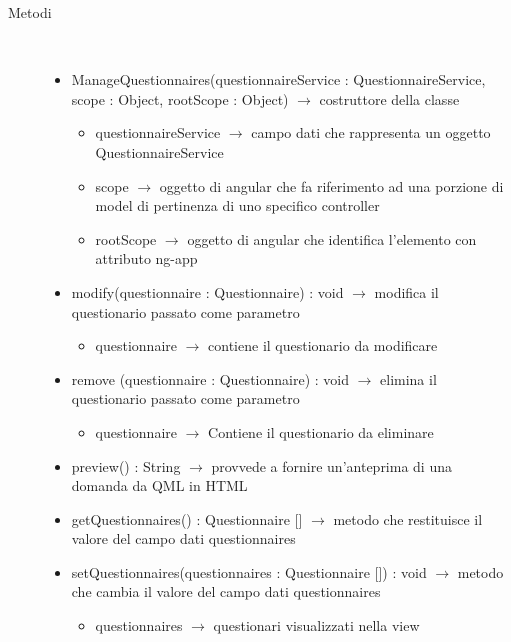 \begin{description}
\item[Metodi] \hfill \\
\vspace{-7mm}
\begin{itemize}
	\item ManageQuestionnaires(questionnaireService : QuestionnaireService, scope : Object, rootScope : Object) $\rightarrow$ costruttore della classe\begin{itemize}
		\item questionnaireService $\rightarrow$ campo dati che rappresenta un oggetto QuestionnaireService
		\item scope $\rightarrow$ oggetto di angular che fa riferimento ad una porzione di model di pertinenza di uno specifico controller
		\item rootScope $\rightarrow$ oggetto di angular che identifica l’elemento con attributo ng-app
	\end{itemize}
	
	\item modify(questionnaire : Questionnaire) : void $\rightarrow$ modifica il questionario passato come parametro\begin{itemize}
		\item questionnaire $\rightarrow$ contiene il questionario da modificare 
	\end{itemize}
	
	\item remove (questionnaire : Questionnaire) : void $\rightarrow$ elimina il questionario passato come parametro\begin{itemize}
		\item questionnaire $\rightarrow$  Contiene il questionario da eliminare 
	\end{itemize}
	
	\item preview() : String $\rightarrow$ provvede a fornire un'anteprima di una domanda da QML in HTML
	\item getQuestionnaires() : Questionnaire [] $\rightarrow$ metodo che restituisce il valore del campo dati questionnaires
	\item setQuestionnaires(questionnaires : Questionnaire []) : void $\rightarrow$ metodo che cambia il valore del campo dati questionnaires\begin{itemize}
		\item questionnaires $\rightarrow$ questionari visualizzati nella view
	\end{itemize}
	
\end{itemize}

\end{description}

